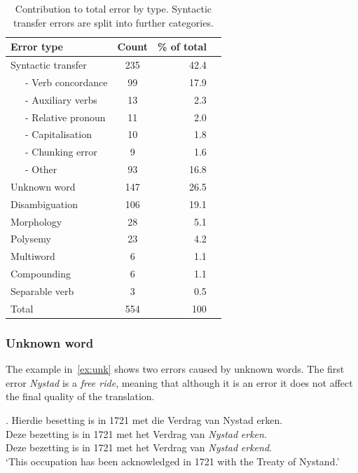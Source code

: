 \documentclass[11pt]{article}
\begin{document}
\begin{table}
  \begin{center}
  \begin{tabular}{|l|c|r|r|}
     \hline
     {\bf Error type}    & {\bf Count} & {\bf \% of total} \\
     \hline
     Syntactic transfer   & 235         & 42.4 \\
     \hline
     ~~~- Verb concordance & 99          & 17.9 \\
     ~~~- Auxiliary verbs & 13          & 2.3 \\ 
     ~~~- Relative pronoun& 11          & 2.0 \\
     ~~~- Capitalisation  & 10          & 1.8 \\
     ~~~- Chunking error  & 9           & 1.6 \\
     ~~~- Other           & 93          & 16.8 \\
     \hline
     Unknown word         & 147         & 26.5 \\
     Disambiguation       & 106         & 19.1 \\
     Morphology           & 28          & 5.1 \\
     Polysemy             & 23          & 4.2 \\
     Multiword            & 6           & 1.1 \\
     Compounding          & 6           & 1.1 \\
     Separable verb       & 3           & 0.5 \\
     \hline
     Total                & 554         & 100 \\
     \hline
  \end{tabular}
    \caption{Contribution to total error by type. Syntactic transfer errors are split into 
      further categories.}
    \label{table:qual}
  \end{center}
\end{table}

\subsubsection{Unknown word}

The example in~\ref{ex:unk} shows two errors caused by unknown words. The first error {\em Nystad} 
is a {\em free ride}, meaning that although it is an error it does not affect the final quality
of the translation. 

\ex. \label{ex:unk} 
    Hierdie besetting is in 1721 met die Verdrag van Nystad erken. \\
    Deze bezetting is in 1721 met het Verdrag van {\em *Nystad} {\em *erken}. \\
    Deze bezetting is in 1721 met het Verdrag van {\em Nystad} {\em erkend}. \\
    `This occupation has been acknowledged in 1721 with the Treaty of Nystand.'
\end{document}
